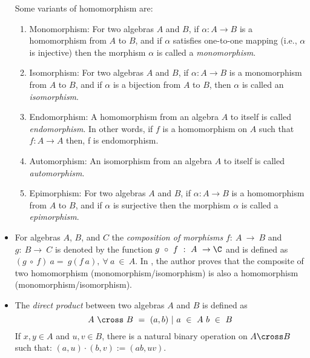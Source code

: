 \begin{itemize}
    Some variants of homomorphism are:
    \begin{enumerate}
        \item  Monomorphism: For two algebras $A$ and $B$, if \(\alpha : A
        \rightarrow B \) is a homomorphism from $A$ to $B$, and if \(\alpha\)
        satisfies one-to-one mapping (i.e., \(\alpha\) is injective) then the
        morphism \(\alpha\) is called a \textit{monomorphism}.

        \item Isomorphism: For two algebras $A$ and $B$, if \(\alpha : A \rightarrow B \)  is
        a monomorphism from $A$ to $B$, and if \(\alpha\) is a bijection from
        $A$ to $B$, then \(\alpha\) is called an \textit{isomorphism}.  

        \item Endomorphism: A homomorphism from an algebra $A$ to itself is
        called \textit{endomorphism}. In other words, if $f$ is a homomorphism on $A$
        such that $f:A\rightarrow A$ then, f is endomorphism.

        \item Automorphism: An isomorphism from an algebra $A$ to itself is
        called \textit{automorphism}.

        \item Epimorphism: For two algebras $A$ and $B$, if \(\alpha : A
        \rightarrow B \) is a homomorphism from $A$ to $B$, and if \(\alpha\) is
        surjective then the morphism \(\alpha\) is called a
        \textit{epimorphism}.
    \end{enumerate}

    \item For algebras $A$, $B$, and $C$ the \textit{composition of morphisms} $f:\ A \
    \rightarrow \ B$ and $g:\ B \rightarrow\ C$ is denoted by the function $g\
    \circ\ f\ :\ A\ \rightarrow \C$ and is defined as $(g\ \circ\ f)\ a = \ g(f\
    a), \ \forall\ a\ \in\ A$. In \cite{sankappanavar1981course}, the author
    proves that the composite of two homomorphism (monomorphism/isomorphism) is
    also a homomorphism (monomorphism/isomorphism).

    \item The \textit{direct product} between two algebras $A$ and $B$ is
    defined as \[A\ \cross\ B\ =\ {(a,b)\ |\ a \ \in \ A\ b \ \in\ B}\] If
    $x,y\in A$ and $u,v \in B$, there is a natural binary operation on $A \cross
    B$ such that: $(a,u)\cdot(b,v):=(ab,uv)$. 

\end{itemize}

